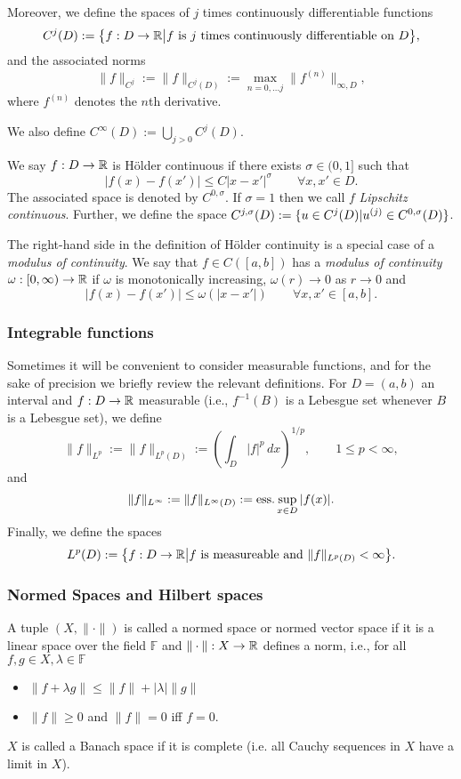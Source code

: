 Moreover, we define the spaces of $j$ times continuously differentiable functions
\[
  C^j(D) := \big\{ f : D \to \mathbb{R} \big| f \text{ is $j$ times continuously
                differentiable on } D \big\},
\]
and the associated norms
\[
   \|f \|_{C^j} :=  \|f \|_{C^j(D)} :=
    \max_{n = 0, \dots j} \| f^{(n)} \|_{\infty, D},
\]
where $f^{(n)}$ denotes the $n$th derivative.

We also define $C^\infty(D) := \bigcup_{j > 0} C^j(D)$.

We say $f : D \to \mathbb{R}$ is H\"{o}lder continuous if there exists $\sigma \in (0, 1]$
such that
\[
    |f(x) - f(x')| \leq C |x - x'|^\sigma \qquad \forall x, x' \in D.
\]
The associated space is denoted by $C^{0,\sigma}$. If $\sigma = 1$ then
we call $f$ {\em Lipschitz continuous}. Further, we define the space
$C^{j,\sigma}(D) := \{ u \in C^j(D) | u^{(j)} \in C^{0,\sigma}(D)\}$.

The right-hand side in the definition of H\"{o}lder  continuity is 
a special case of a {\em modulus of continuity}. We say that $f \in C([a,b])$ has a 
{\em modulus of continuity} $\omega : [0, \infty) \to \mathbb{R}$ if 
$\omega$ is monotonically increasing, $\omega(r) \to 0$ as $r \to 0$ and 
\[
  |f(x) - f(x')| \leq \omega(|x-x'|) \qquad \forall x, x' \in [a,b].
\]


\subsubsection{Integrable functions}
%
Sometimes it will be convenient to consider measurable functions, and
for the sake of precision we briefly review the relevant definitions.
For $D = (a, b)$ an interval and $f : D \to \mathbb{R}$ measurable (i.e.,
$f^{-1}(B)$ is a Lebesgue set whenever $B$ is a Lebesgue set), we define
\[
    \| f \|_{L^p} := \|f \|_{L^p(D)} :=
      \left(\int_D |f|^p \,dx\right)^{1/p}, \qquad 1 \leq p < \infty,
\]
and
\[
    \|f\|_{L^\infty} := \|f\|_{L^\infty(D)} :=
    {\rm ess.}\sup_{x \in D} |f(x)|.
\]
Finally, we define the spaces
\[
  L^p(D) := \big\{ f : D \to \mathbb{R} \big| \text{$f$ is measureable
                  and $\|f\|_{L^p(D)} < \infty$} \big\}.
\]


\subsubsection{Normed Spaces and Hilbert spaces}
%
A tuple $(X, \|\cdot\|)$ is called a normed space or normed vector space if
it is a linear space over the field $\mathbb{F}$ and
$\|\cdot\| : X \to \mathbb{R}$ defines a norm, i.e., for all $f, g \in X, \lambda \in \mathbb{F}$
\begin{itemize}
  \item $\|f + \lambda g\| \leq \|f\| + |\lambda| \|g\|$
  \item $\|f\| \geq 0$ and $\|f\| = 0$ iff $f = 0$.
\end{itemize}
$X$ is called a Banach space if it is complete (i.e. all Cauchy sequences
in $X$ have a limit in $X$).

